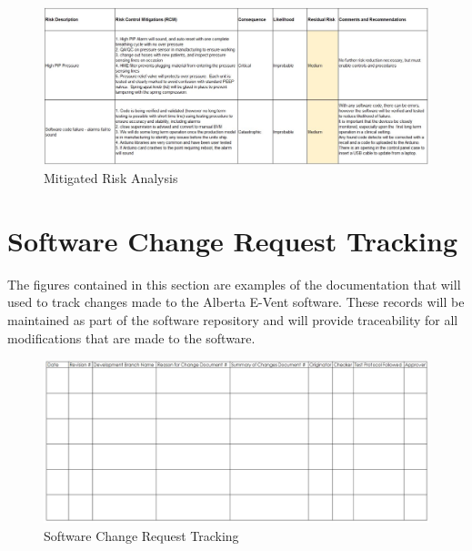 \documentclass[]{article}
\begin{document}
\begin{appendices}
\begin{figure}
	\includegraphics[scale= 0.6]{figures/mit4.jpg}
	\caption{Mitigated Risk Analysis}
	\label{fig:mit4}
\end{figure}


\clearpage
\section{Software Change Request Tracking}
\label{app:change}
The figures contained in this section are examples of the documentation that will used to track changes made to the Alberta E-Vent software.  These records will be maintained as part of the software repository and will provide traceability for all modifications that are made to the software.

\begin{figure}
	\includegraphics[scale= 0.6]{figures/change.jpg}
	\caption{Software Change Request Tracking}
	\label{fig:change_tracking}
\end{figure}

\end{appendices}
\end{document}
